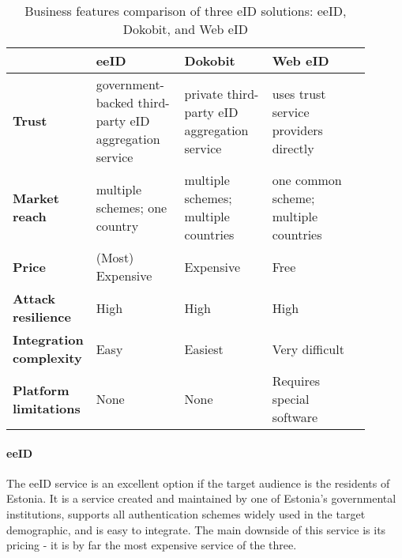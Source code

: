 \begin{table}
    \centering
    \begin{tabular}{ p{0.15\linewidth} | >{\raggedright}p{0.25\linewidth} | >{\raggedright}p{0.25\linewidth} | >{\raggedright}p{0.25\linewidth} p{0px}}
                                        & \textbf{eeID}                                         & \textbf{Dokobit}                            & \textbf{Web eID}                      & \\
        \hline
        \textbf{Trust}                  & government-backed third-party eID aggregation service & private third-party eID aggregation service & uses trust service providers directly & \\
        \hline
        \textbf{Market reach}           & multiple schemes; one country                         & multiple schemes; multiple countries        & one common scheme; multiple countries & \\
        \hline
        \textbf{Price}                  & (Most) Expensive                                      & Expensive                                   & Free                                  & \\
        \hline
        \textbf{Attack resilience}      & High                                                  & High                                        & High                                  & \\
        \hline
        \textbf{Integration complexity} & Easy                                                  & Easiest                                     & Very difficult                        & \\
        \hline
        \textbf{Platform limitations}   & None                                                  & None                                        & Requires special software             & \\
    \end{tabular}
    \caption{Business features comparison of three eID solutions: eeID, Dokobit, and Web eID}
    \label{tbl:summary-comparison-business}
\end{table}

\paragraph{eeID}

The eeID service is an excellent option if the target audience is the residents of Estonia. It is a service created and maintained by one of Estonia's governmental institutions, supports all authentication schemes widely used in the target demographic, and is easy to integrate. The main downside of this service is its pricing - it is by far the most expensive service of the three.


